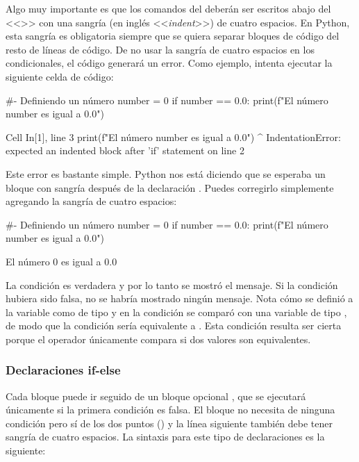 Algo muy importante es que los comandos del  deberán ser escritos abajo del <<>> con una sangría (en inglés <<\emph{indent}>>) de cuatro espacios. En Python, esta sangría es obligatoria siempre que se quiera separar bloques de código del resto de líneas de código. De no usar la sangría de cuatro espacios en los condicionales, el código generará un error. Como ejemplo, intenta ejecutar la siguiente celda de código:

\begin{pyin}[]
#- Definiendo un número
number = 0 
if number == 0.0:
print(f"El número {number} es igual a 0.0")
\end{pyin}
\begin{pyerror}
  Cell In[1], line 3
    print(f"El número {number} es igual a 0.0")
    ^
IndentationError: expected an indented block after 'if' statement on line 2
\end{pyerror}

Este error es bastante simple. Python nos está diciendo que se esperaba un bloque con sangría después de la declaración . Puedes corregirlo simplemente agregando la sangría de cuatro espacios:

\begin{pyin}[]
#- Definiendo un número
number = 0 
if number == 0.0:
    print(f"El número {number} es igual a 0.0")
\end{pyin}
\begin{pyout}
El número 0 es igual a 0.0
\end{pyout}

La condición  es verdadera y por lo tanto se mostró el mensaje. Si la condición hubiera sido falsa, no se habría mostrado ningún mensaje. Nota cómo se definió a la variable  como de tipo  y en la condición se comparó con una variable de tipo , de modo que la condición sería equivalente a . Esta condición resulta ser cierta porque el operador \pynorm{==} únicamente compara si dos valores son equivalentes.

\subsubsection{Declaraciones if-else}
Cada bloque  puede ir seguido de un bloque opcional , que se ejecutará únicamente si la primera condición es falsa. El bloque  no necesita de ninguna condición pero sí de los dos puntos (\pynorm{:}) y la línea siguiente también debe tener sangría de cuatro espacios. La sintaxis para este tipo de declaraciones es la siguiente:

